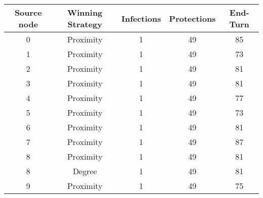 \documentclass[results.tex]{subfiles}
\begin{document}
    \begin{center}
        \begin{tabular}{| c || c | c | c | c |}
            \hline
            {\bfseries Source node} & {\bfseries Winning Strategy} & {\bfseries Infections} & {\bfseries Protections}
            & {\bfseries End-Turn}
            \\  %
            \hline\hline
            0                       & Proximity                    & 1                      & 49                      & 85                   \\
            \hline
            1                       & Proximity                    & 1                      & 49                      & 73                   \\
            \hline
            2                       & Proximity                    & 1                      & 49                      & 81                   \\
            \hline
            3                       & Proximity                    & 1                      & 49                      & 81                   \\
            \hline
            4                       & Proximity                    & 1                      & 49                      & 77                   \\
            \hline
            5                       & Proximity                    & 1                      & 49                      & 73                   \\
            \hline
            6                       & Proximity                    & 1                      & 49                      & 81                   \\
            \hline
            7                       & Proximity                    & 1                      & 49                      & 87                   \\
            \hline
            8                       & Proximity                    & 1                      & 49                      & 81                   \\
            \hline
            8                       & Degree                       & 1                      & 49                      & 81                   \\
            \hline
            9                       & Proximity                    & 1                      & 49                      & 75                   \\

\end{tabular}
\end{center}
\end{document}
